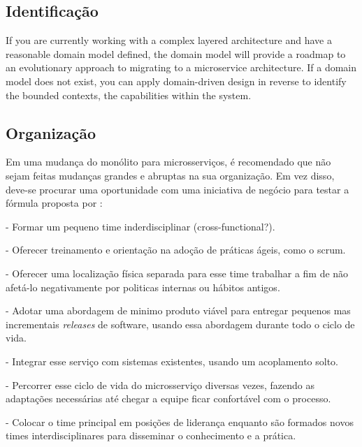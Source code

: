 \subsection{Identificação}

If you are currently working with a complex layered architecture and have a reasonable domain model defined, the domain model will provide a roadmap to an evolutionary approach to migrating to a microservice architecture. If a domain model does not exist, you can apply domain-driven design in reverse to identify the bounded contexts, the capabilities within the system. \cite{Familiar2015}


\subsection{Organização}

Em uma mudança do monólito para microsserviços, é recomendado que não sejam feitas mudanças grandes e abruptas na sua organização. Em vez disso, deve-se procurar uma oportunidade com uma iniciativa de negócio para testar a fórmula proposta por  : 

- Formar um pequeno time inderdisciplinar (cross-functional?).

- Oferecer treinamento e orientação na adoção de práticas ágeis, como o scrum.

- Oferecer uma localização física separada para esse time trabalhar a fim de não afetá-lo negativamente por politicas internas ou hábitos antigos.

- Adotar uma abordagem de minimo produto viável para entregar pequenos mas incrementais \emph{releases} de software, usando essa abordagem durante todo o ciclo de vida.

- Integrar esse serviço com sistemas existentes, usando um acoplamento solto.

- Percorrer esse ciclo de vida do microsserviço diversas vezes, fazendo as adaptações necessárias até chegar a equipe ficar confortável com o processo.

- Colocar o time principal em posições de liderança enquanto são formados novos times interdisciplinares para disseminar o conhecimento e a prática.
